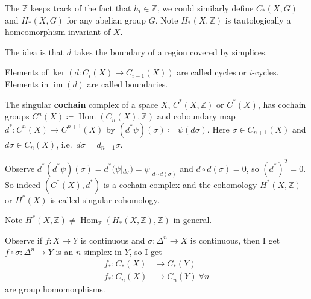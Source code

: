 \documentclass{article}
\DeclareMathOperator{\im}{im}
\DeclareMathOperator{\Hom}{Hom}
\begin{document}
The $\mathbb{Z}$ keeps track of the fact that $h_i \in \mathbb{Z}$, we could similarly define $C_*(X, G)$ and $H_*(X,G)$ for any abelian group $G$.
Note $H_*(X,\mathbb{Z})$ is tautologically a homeomorphism invariant of $X$.

The idea is that $d$ takes the boundary of a region covered by simplices.

Elements of $\ker(d: C_i(X) \to C_{i-1}(X))$ are called cycles or $i$-cycles.
Elements in $\im(d)$ are called boundaries.

\begin{defi} 
  The singular \textbf{cochain} complex of a space $X$, $C^*(X, \mathbb{Z})$ or $C^*(X)$, has cochain groups $C^n(X) \coloneqq \Hom(C_n(X), \mathbb{Z})$ and coboundary map $d^*: C^n(X) \to C^{n+1}(X)$ by $(d^* \psi)(\sigma) \coloneqq \psi(d \sigma)$. Here $\sigma \in C_{n+1}(X)$ and $d \sigma \in C_n(X)$, i.e.\ $d \sigma = d_{n+1} \sigma$.
\end{defi}
Observe $d^*(d^* \psi) (\sigma) = d^*(\psi|_{d \sigma}) = \psi|_{d \circ d(\sigma)}$ and $d \circ d(\sigma) = 0$, so $(d^*)^2 = 0$.
So indeed $(C^*(X), d^*)$ is a cochain complex and the cohomology $H^*(X,\mathbb{Z})$ or $H^*(X)$ is called singular cohomology.

Note $H^*(X,\mathbb{Z}) \neq \Hom_{\mathbb{Z}}(H_*(X,\mathbb{Z}),\mathbb{Z})$ in general.

Observe if $f: X \to Y$ is continuous and $\sigma: \Delta^n \to X$ is continuous, then I get $f \circ \sigma: \Delta^n \to Y$ is an $n$-simplex in $Y$, so I get
\begin{align*}
  f_*: C_*(X) &\to C_*(Y) \\
  f_*: C_n(X) &\to C_n(Y) \ \forall n
\end{align*}
are group homomorphisms.
\end{document}
